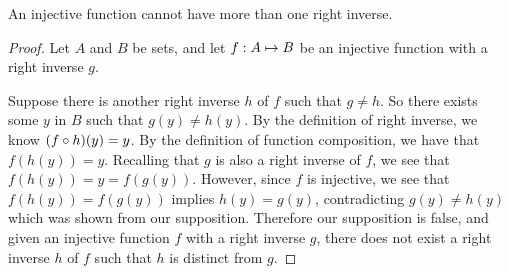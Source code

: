 \documentclass[main.tex]{subfiles}
\begin{document}
\begin{thm}
	An injective function cannot have more than one right inverse.
\end{thm}
\begin{proof}
	Let \(A\) and \(B\) be sets, and let \({f}: {A} \mapsto{} {B}\) be an
	injective function with a right inverse \(g\).

	Suppose there is another right inverse \(h\) of \(f\) such that
	\(g \neq h\). So there exists some \(y\) in \(B\) such that
	\(g(y) \neq h(y)\). By the definition of right inverse, we know
	\(({f} \circ{} {h})({y}) = y\). By the definition of function
	composition, we have that \(f(h(y)) = y\). Recalling that \(g\) is also
	a right inverse of \(f\), we see that \(f(h(y)) = y = f(g(y))\).
	However, since \(f\) is injective, we see that \(f(h(y)) = f(g(y))\)
	implies \(h(y) = g(y)\), contradicting \(g(y) \neq h(y)\) which was
	shown from our supposition. Therefore our supposition is false, and
	given an injective function \(f\) with a right inverse \(g\), there does
	not exist a right inverse \(h\) of \(f\) such that \(h\) is distinct
	from \(g\).
\end{proof}
\end{document}
